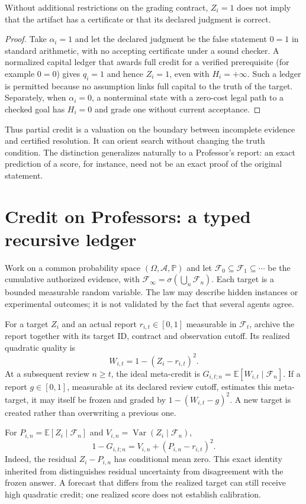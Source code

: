\documentclass[11pt]{article}
\newcommand{\E}{\mathbb E}\newcommand{\Prob}{\mathbb P}\newcommand{\F}{\mathcal F}\newcommand{\N}{\mathbb N}\newcommand{\Var}{\operatorname{Var}}\newcommand{\one}{\mathbf 1}\newcommand{\spp}{\mathrm{SPP}}
\begin{document}
\begin{proposition}
Without additional restrictions on the grading contract, $Z_i=1$ does not imply that the artifact has a certificate or that its declared judgment is correct.
\end{proposition}
\begin{proof}Take $\alpha_i=1$ and let the declared judgment be the false statement $0=1$ in standard arithmetic, with no accepting certificate under a sound checker. A normalized capital ledger that awards full credit for a verified prerequisite (for example $0=0$) gives $q_i=1$ and hence $Z_i=1$, even with $H_i=+\infty$. Such a ledger is permitted because no assumption links full capital to the truth of the target. Separately, when $\alpha_i=0$, a nonterminal state with a zero-cost legal path to a checked goal has $H_i=0$ and grade one without current acceptance.\end{proof}

Thus partial credit is a valuation on the boundary between incomplete evidence and certified resolution. It can orient search without changing the truth condition. The distinction generalizes naturally to a Professor's report: an exact prediction of a score, for instance, need not be an exact proof of the original statement.

\section{Credit on Professors: a typed recursive ledger}
Work on a common probability space $(\Omega,\mathcal A,\Prob)$ and let $\F_0\subseteq\F_1\subseteq\cdots$ be the cumulative authorized evidence, with $\F_\infty=\sigma(\bigcup_n\F_n)$. Each target is a bounded measurable random variable. The law may describe hidden instances or experimental outcomes; it is not validated by the fact that several agents agree.

\begin{definition}
For a target $Z_i$ and an actual report $r_{i,t}\in[0,1]$ measurable in $\F_t$, archive the report together with its target ID, contract and observation cutoff. Its realized quadratic quality is
\begin{equation}W_{i,t}=1-(Z_i-r_{i,t})^2.\end{equation}
At a subsequent review $n\geq t$, the ideal meta-credit is $G_{i,t;n}=\E[W_{i,t}\mid\F_n]$. If a report $g\in[0,1]$, measurable at its declared review cutoff, estimates this meta-target, it may itself be frozen and graded by $1-(W_{i,t}-g)^2$. A new target is created rather than overwriting a previous one.
\end{definition}
For $P_{i,n}=\E[Z_i\mid\F_n]$ and $V_{i,n}=\Var(Z_i\mid\F_n)$,
\begin{equation}1-G_{i,t;n}=V_{i,n}+(P_{i,n}-r_{i,t})^2.\label{eq:meta}\end{equation}
Indeed, the residual $Z_i-P_{i,n}$ has conditional mean zero. This exact identity inherited from \cite{professor} distinguishes residual uncertainty from disagreement with the frozen answer. A forecast that differs from the realized target can still receive high quadratic credit; one realized score does not establish calibration.
\end{document}
